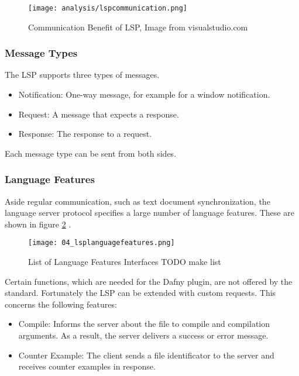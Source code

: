 \begin{figure}[h]
    \centering
    \texttt{[image: analysis/lspcommunication.png]}
    \caption{Communication Benefit of LSP, Image from visualstudio.com \cite{lspextensionguide}}
    \label{fig:lspcommunication}
\end{figure}

\subsubsection{Message Types}
The LSP supports three types of messages.
\begin{itemize}
    \item Notification: One-way message, for example for a window notification.
    \item Request: A message that expects a response.
    \item Response: The response to a request.
\end{itemize}
Each message type can be sent from both sides.

\subsubsection{Language Features}
Aside regular communication, such as text document synchronization,
the language server protocol specifies a large number of language features.
These are shown in figure \ref{fig:lsplanguagefeatures} \cite{lspspec}.

\begin{figure}[H]
    \centering
    \texttt{[image: 04\_lsplanguagefeatures.png]}
    \caption{List of Language Features Interfaces TODO make list}
    \label{fig:lsplanguagefeatures}
\end{figure}

Certain functions, which are needed for the Dafny plugin, are not offered by the standard.
Fortunately the LSP can be extended with custom requests. This concerns the following features:
\begin{itemize}
    \item Compile: Informs the server about the file to compile and compilation arguments.
          As a result, the server delivers a success or error message.
    \item Counter Example: The client sends a file identificator to the server and receives
           counter examples in response.
\end{itemize}

